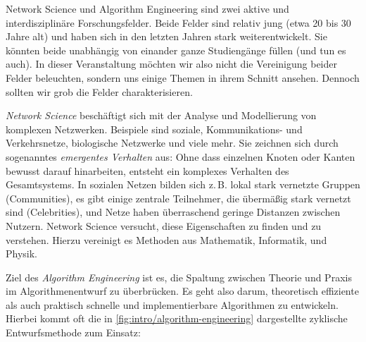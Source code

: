 \glqq Network Science\grqq{} und \glqq Algorithm Engineering\grqq{} sind zwei aktive und interdisziplinäre Forschungsfelder.
Beide Felder sind relativ jung (etwa 20 bis 30 Jahre alt) und haben sich in den letzten Jahren stark weiterentwickelt.
Sie könnten beide unabhängig von einander ganze Studiengänge füllen (und tun es auch).
In dieser Veranstaltung möchten wir also nicht die Vereinigung beider Felder beleuchten, sondern uns einige Themen in ihrem Schnitt ansehen.
Dennoch sollten wir grob die Felder charakterisieren.

\emph{Network Science} beschäftigt sich mit der Analyse und Modellierung von komplexen Netzwerken.
Beispiele sind soziale, Kommunikations- und Verkehrsnetze, biologische Netzwerke und viele mehr.
Sie zeichnen sich durch sogenanntes \emph{emergentes Verhalten} aus: Ohne dass einzelnen Knoten oder Kanten bewusst darauf hinarbeiten, entsteht ein komplexes Verhalten des Gesamtsystems.
In sozialen Netzen bilden sich z.\,B. lokal stark vernetzte Gruppen (Communities), es gibt einige zentrale Teilnehmer, die übermäßig stark vernetzt sind (Celebrities), und Netze haben überraschend geringe Distanzen zwischen Nutzern.
Network Science versucht, diese Eigenschaften zu finden und zu verstehen.
Hierzu vereinigt es Methoden aus Mathematik, Informatik, und Physik.

\vspace{-2em}
Ziel des \emph{Algorithm Engineering} ist es, die Spaltung zwischen Theorie und Praxis im Algorithmenentwurf zu überbrücken.
Es geht also darum, theoretisch effiziente als auch praktisch schnelle und implementierbare Algorithmen zu entwickeln.
Hierbei kommt oft die in \cref{fig:intro/algorithm-engineering} dargestellte zyklische Entwurfsmethode zum Einsatz:

